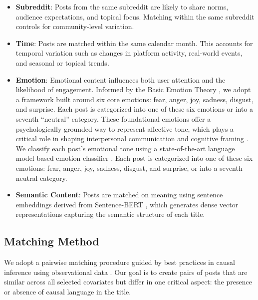 \documentclass[acmsmall]{acmart}
\begin{document}
\begin{itemize}
    \item \textbf{Subreddit}: Posts from the same subreddit are likely to share norms, audience expectations, and topical focus. Matching within the same subreddit controls for community-level variation.

    \item \textbf{Time}: Posts are matched within the same calendar month. This accounts for temporal variation such as changes in platform activity, real-world events, and seasonal or topical trends.

    \item \textbf{Emotion}: Emotional content influences both user attention and the likelihood of engagement. Informed by the Basic Emotion Theory \cite{ekman1999basic}, we adopt a framework built around six core emotions: fear, anger, joy, sadness, disgust, and surprise. Each post is categorized into one of these six emotions or into a seventh ``neutral'' category. These foundational emotions offer a psychologically grounded way to represent affective tone, which plays a critical role in shaping interpersonal communication and cognitive framing \cite{berger2012makes, brady2017emotion}. We classify each post’s emotional tone using a state-of-the-art language model-based emotion classifier \cite{hartmann2022emotionenglish}. Each post is categorized into one of these six emotions: fear, anger, joy, sadness, disgust, and surprise, or into a seventh neutral category.

    \item \textbf{Semantic Content}: Posts are matched on meaning using sentence embeddings derived from Sentence-BERT \cite{reimers-2019-sentence-bert}, which generates dense vector representations capturing the semantic structure of each title.
\end{itemize}






\subsection{Matching Method}

We adopt a pairwise matching procedure guided by best practices in causal inference using observational data \cite{stuart2010matching}. Our goal is to create pairs of posts that are similar across all selected covariates but differ in one critical aspect: the presence or absence of causal language in the title.
\end{document}
